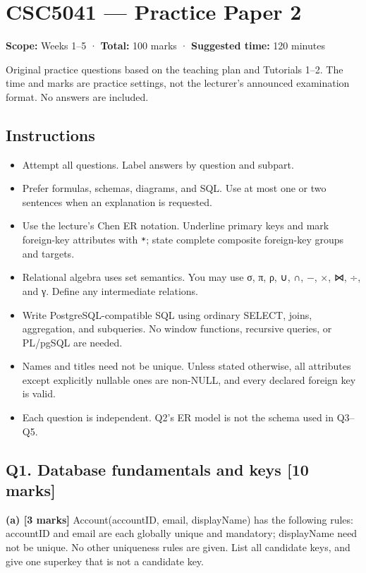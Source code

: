 \clearpage
\section{CSC5041 --- Practice Paper 2}\label{practice_paper_2}

\textbf{Scope:} Weeks 1--5 · \textbf{Total:} 100 marks · \textbf{Suggested time:} 120 minutes

Original practice questions based on the teaching plan and Tutorials 1--2. The time and marks are practice settings, not the lecturer's announced examination format. No answers are included.

\subsection{Instructions}\label{practice_paper_2-instructions}

\begin{itemize}
\tightlist
\item
  Attempt all questions. Label answers by question and subpart.
\item
  Prefer formulas, schemas, diagrams, and SQL. Use at most one or two sentences when an explanation is requested.
\item
  Use the lecture's Chen ER notation. Underline primary keys and mark foreign-key attributes with \texttt{*}; state complete composite foreign-key groups and targets.
\item
  Relational algebra uses set semantics. You may use σ, π, ρ, ∪, ∩, −, ×, ⋈, ÷, and γ. Define any intermediate relations.
\item
  Write PostgreSQL-compatible SQL using ordinary SELECT, joins, aggregation, and subqueries. No window functions, recursive queries, or PL/pgSQL are needed.
\item
  Names and titles need not be unique. Unless stated otherwise, all attributes except explicitly nullable ones are non-NULL, and every declared foreign key is valid.
\item
  Each question is independent. Q2's ER model is not the schema used in Q3--Q5.
\end{itemize}

\subsection{Q1. Database fundamentals and keys {[}10 marks{]}}\label{practice_paper_2-q1.-database-fundamentals-and-keys-10-marks}

\textbf{(a) {[}3 marks{]}} Account(accountID, email, displayName) has the following rules: accountID and email are each globally unique and mandatory; displayName need not be unique. No other uniqueness rules are given. List all candidate keys, and give one superkey that is not a candidate key.

